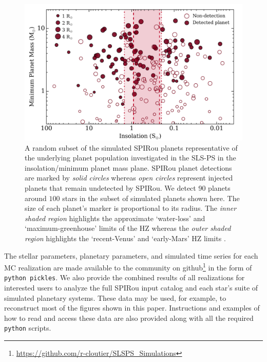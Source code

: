 \begin{figure}
  \centering
  \includegraphics[width=0.8\hsize]{figures/SPIRoudet_Fmpsini.png}%
  \caption[One realization of targetted and detected planets in the SLS-PS versus insolation and ]
      {\small A random subset of the simulated SPIRou planets representative of the underlying planet
    population investigated in the SLS-PS in the insolation/minimum planet mass plane.
    SPIRou planet detections are marked by
    \emph{solid circles} whereas \emph{open circles} represent injected planets that remain undetected by SPIRou.
    We detect 90 planets around $100$ stars in the subset of simulated planets shown here.
    The size of each planet's marker is proportional to its radius. The \emph{inner shaded region} highlights
    the approximate `water-loss' and `maximum-greenhouse' limits of the HZ whereas the
    \emph{outer shaded region} highlights the `recent-Venus' and `early-Mars' HZ limits \citep{kopparapu13}.}
  \label{BSfig:spiroudet}
\end{figure}


The stellar parameters, planetary parameters, and simulated time series for each MC realization are made
available to the community on
github\footnote{\href{https://github.com/r-cloutier/SLSPS\_Simulations}{https://github.com/r-cloutier/SLSPS\_Simulations}}
in the form of \texttt{python pickles}.
We also provide the combined results of all realizations for interested users to analyze the full SPIRou
input catalog and each star's suite of simulated planetary systems. These data may be used, for example,
to reconstruct most of the figures shown in this paper. Instructions and examples of how to read and
access these data are also provided along with all the required \texttt{python} scripts. \\


